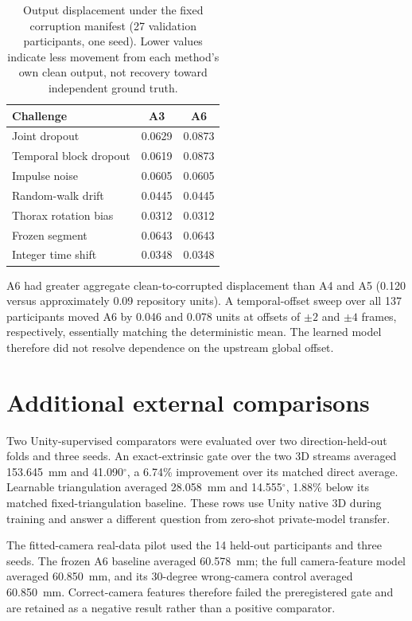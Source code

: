 \documentclass[pdflatex,sn-mathphys-num]{sn-jnl}
\begin{document}
\begin{table}[h]
\caption{Output displacement under the fixed corruption manifest (27
validation participants, one seed). Lower values indicate less movement from
each method's own clean output, not recovery toward independent ground truth.}
\label{tab:robustness}
\centering
\small
\begin{tabular}{lcc}
\toprule
Challenge & A3 & A6\\
\midrule
Joint dropout & 0.0629 & 0.0873\\
Temporal block dropout & 0.0619 & 0.0873\\
Impulse noise & 0.0605 & 0.0605\\
Random-walk drift & 0.0445 & 0.0445\\
Thorax rotation bias & 0.0312 & 0.0312\\
Frozen segment & 0.0643 & 0.0643\\
Integer time shift & 0.0348 & 0.0348\\
\bottomrule
\end{tabular}
\end{table}

A6 had greater aggregate clean-to-corrupted displacement than A4 and A5
(0.120 versus approximately 0.09 repository units). A temporal-offset sweep
over all 137 participants moved A6 by 0.046 and 0.078 units at offsets of
$\pm2$ and $\pm4$ frames, respectively, essentially matching the deterministic
mean. The learned model therefore did not resolve dependence on the upstream
global offset.

\section{Additional external comparisons}

Two Unity-supervised comparators were evaluated over two direction-held-out
folds and three seeds. An exact-extrinsic gate over the two 3D streams averaged
153.645~mm and 41.090$^\circ$, a 6.74\% improvement over its matched direct
average. Learnable triangulation averaged 28.058~mm and 14.555$^\circ$, 1.88\%
below its matched fixed-triangulation baseline. These rows use Unity native 3D
during training and answer a different question from zero-shot private-model
transfer.

The fitted-camera real-data pilot used the 14 held-out participants and three
seeds. The frozen A6 baseline averaged 60.578~mm; the full camera-feature model
averaged 60.850~mm, and its 30-degree wrong-camera control averaged
60.850~mm. Correct-camera features therefore failed the preregistered gate and
are retained as a negative result rather than a positive comparator.
\end{document}
